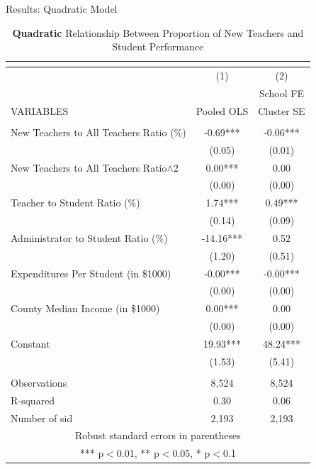 \documentclass[notes]{beamer}
\begin{document}
\begin{frame}{Results: Quadratic Model}
\begin{table}[hbtp]
    \centering
    \tiny 
    \caption{\textbf{Quadratic} Relationship Between Proportion of New Teachers and Student Performance}
    \begin{tabular}{lcc}
\multicolumn{3}{c}{} \\ \hline\hline 
 & (1) & (2) \\
 &  & School FE \\
VARIABLES & Pooled OLS & Cluster SE \\ \hline
 &  &  \\
\rowcolor{yellow}New Teachers to All Teachers Ratio (\%) & -0.69*** & -0.06*** \\
 & (0.05) & (0.01) \\
\rowcolor{yellow}New Teachers to All Teachers Ratio$\wedge$2 & 0.00*** & 0.00 \\
 & (0.00) & (0.00) \\
Teacher to Student Ratio (\%) & 1.74*** & 0.49*** \\
 & (0.14) & (0.09) \\
Administrator to Student Ratio (\%) & -14.16*** & 0.52 \\
 & (1.20) & (0.51) \\
Expenditures Per Student (in \$1000) & -0.00*** & -0.00*** \\
 & (0.00) & (0.00) \\
County Median Income (in \$1000) & 0.00*** & 0.00 \\
 & (0.00) & (0.00) \\
Constant & 19.93*** & 48.24*** \\
 & (1.53) & (5.41) \\
 &  &  \\
 \hline
Observations & 8,524 & 8,524 \\
R-squared & 0.30 & 0.06 \\
 Number of sid & 2,193  & 2,193 \\ \hline\hline
\multicolumn{3}{c}{ Robust standard errors in parentheses} \\
\multicolumn{3}{c}{ *** p$<$0.01, ** p$<$0.05, * p$<$0.1} \\
\end{tabular}
\end{table}
\end{frame}
\end{document}
